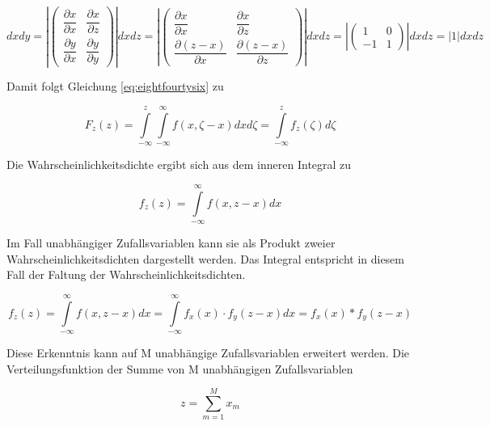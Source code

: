 \begin{equation}\label{eq:eightfourtyeight}
dxdy=\left|\left(\begin{array}{cc} {\dfrac{\partial x}{\partial x}} & {\dfrac{\partial x}{\partial z}} \\ {\dfrac{\partial y}{\partial x}} & {\dfrac{\partial y}{\partial y}} \end{array}\right)\right|dxdz=\left|\left(\begin{array}{cc} {\dfrac{\partial x}{\partial x}} & {\dfrac{\partial x}{\partial z}} \\ {\dfrac{\partial (z-x)}{\partial x}} & {\dfrac{\partial (z-x)}{\partial z} } \end{array}\right)\right|dxdz=\left|\left(\begin{array}{cc} {1} & {0} \\ {-1} & {1} \end{array}\right)\right|dxdz=\left|1\right|dxdz
\end{equation}

\noindent Damit folgt Gleichung \eqref{eq:eightfourtysix} zu

\begin{equation}\label{eq:eightfourtynine}
F_{z} (z)=\int\limits _{-\infty}^{z}\int\limits _{-\infty}^{\infty}f(x,\zeta -x) dxd\zeta =\int\limits _{-\infty}^{z}f_{z} (\zeta ) d\zeta
\end{equation}

\noindent Die Wahrscheinlichkeitsdichte ergibt sich aus dem inneren Integral zu

\begin{equation}\label{eq:eightfifty}
f_{z} (z)=\int\limits _{-\infty}^{\infty}f(x,z-x) dx
\end{equation}

\noindent Im Fall unabh\"{a}ngiger Zufallsvariablen kann sie als Produkt zweier Wahrscheinlichkeitsdichten dargestellt werden. Das Integral entspricht in diesem Fall der Faltung der Wahrscheinlichkeitsdichten.

\begin{equation}\label{eq:eightfiftyone}
f_{z} (z)=\int\limits _{-\infty}^{\infty}f(x,z-x) dx =\int\limits _{-\infty}^{\infty}f_{x} (x)\cdot f_{y} (z-x) dx =f_{x} (x)*f_{y} (z-x)
\end{equation}

\noindent Diese Erkenntnis kann auf M unabh\"{a}ngige Zufallsvariablen erweitert werden. Die Verteilungsfunktion der Summe von M unabh\"{a}ngigen Zufallsvariablen

\begin{equation}\label{eq:eightfiftytwo}
z=\sum _{m=1}^{M}x_{m}
\end{equation}

